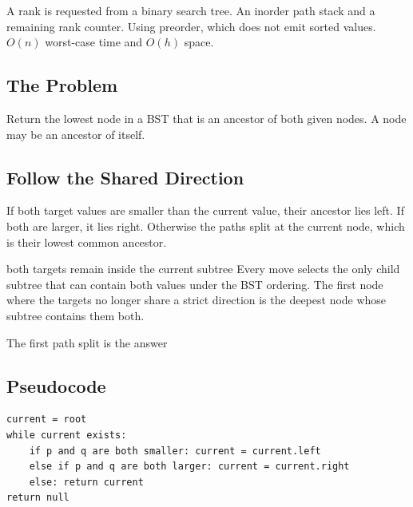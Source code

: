 \chaptercheckpoint
  {A rank is requested from a binary search tree.}
  {An inorder path stack and a remaining rank counter.}
  {Using preorder, which does not emit sorted values.}
  {$O(n)$ worst-case time and $O(h)$ space.}



\subsection{The Problem}
Return the lowest node in a BST that is an ancestor of both given nodes. A
node may be an ancestor of itself.

\subsection{Follow the Shared Direction}
If both target values are smaller than the current value, their ancestor lies
left. If both are larger, it lies right. Otherwise the paths split at the
current node, which is their lowest common ancestor.

\begin{invariantbox}{both targets remain inside the current subtree}
Every move selects the only child subtree that can contain both values under
the BST ordering. The first node where the targets no longer share a strict
direction is the deepest node whose subtree contains them both.
\end{invariantbox}

\begin{visualbox}{The first path split is the answer}
\centering
{}
\end{visualbox}

\subsection{Pseudocode}
\begin{lstlisting}[style=pseudocode]
current = root
while current exists:
    if p and q are both smaller: current = current.left
    else if p and q are both larger: current = current.right
    else: return current
return null
\end{lstlisting}


